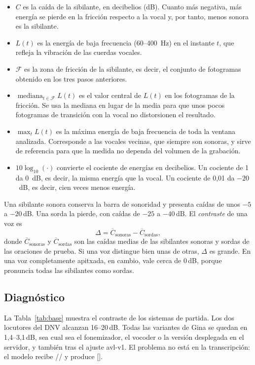 \documentclass[conference]{IEEEtran}
\newcommand{\fz}{\textipa{z}}
\newcommand{\fs}{\textipa{s}}
\newcommand{\dB}{\,dB}
\begin{document}
\begin{itemize}
\item $C$ es la caída de la sibilante, en decibelios (dB). Cuanto más negativa, más energía se pierde en la fricción respecto a la vocal y, por tanto, menos sonora es la sibilante.
\item $L(t)$ es la energía de baja frecuencia (60--400~Hz) en el instante $t$, que refleja la vibración de las cuerdas vocales.
\item $\mathcal{F}$ es la zona de fricción de la sibilante, es decir, el conjunto de fotogramas obtenido en los tres pasos anteriores.
\item $\operatorname{mediana}_{t\in\mathcal{F}} L(t)$ es el valor central de $L(t)$ en los fotogramas de la fricción. Se usa la mediana en lugar de la media para que unos pocos fotogramas de transición con la vocal no distorsionen el resultado.
\item $\max_t L(t)$ es la máxima energía de baja frecuencia de toda la ventana analizada. Corresponde a las vocales vecinas, que siempre son sonoras, y sirve de referencia para que la medida no dependa del volumen de la grabación.
\item $10\log_{10}(\cdot)$ convierte el cociente de energías en decibelios. Un cociente de 1 da 0~dB, es decir, la misma energía que la vocal. Un cociente de 0,01 da $-20$~dB, es decir, cien veces menos energía.
\end{itemize}
Una sibilante sonora conserva la barra de sonoridad y presenta caídas de unos $-5$ a $-20$\dB. Una sorda la pierde, con caídas de $-25$ a $-40$\dB. El \emph{contraste} de una voz es
\begin{equation}
\Delta = \overline{C}_{\text{sonoras}} - \overline{C}_{\text{sordas}},
\end{equation}
donde $\overline{C}_{\text{sonoras}}$ y $\overline{C}_{\text{sordas}}$ son las caídas medias de las sibilantes sonoras y sordas de las oraciones de prueba. Si una voz distingue bien unas de otras, $\Delta$ es grande. En una voz completamente apitxada, en cambio, vale cerca de 0\dB, porque pronuncia todas las sibilantes como sordas.

\subsection{Diagnóstico}
La Tabla~\ref{tab:base} muestra el contraste de los sistemas de partida. Los dos locutores del DNV alcanzan 16--20\dB. Todas las variantes de Gina se quedan en 1,4--3,1\dB, sea cual sea el fonemizador, el vocoder o la versión desplegada en el servidor, y también tras el ajuste avl-v1. El problema no está en la transcripción: el modelo recibe /\fz/ y produce [\fs].
\end{document}
